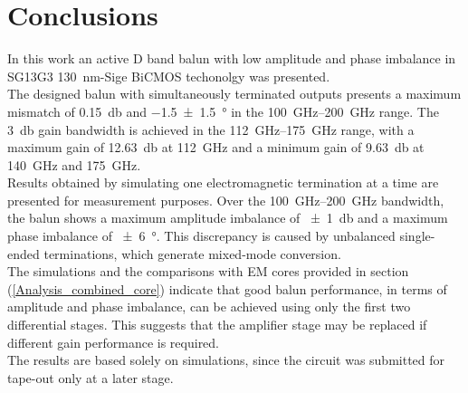 \section{Conclusions}
\label{sec:Conclusion}
In this work an active D band balun with low amplitude and phase imbalance in SG13G3 \SI{130}{\nano\meter}-Sige BiCMOS techonolgy was presented.\\
  
The designed balun with simultaneously terminated outputs presents a maximum mismatch of \SI{0.15}{\decibel} and \SI[separate-uncertainty=true]{-1.5 \pm 1.5}{\degree} in the \SIrange{100}{200}{\giga\hertz} range.
The \SI{3}{\decibel} gain bandwidth is achieved in the \SIrange{112}{175}{\giga\hertz} range, with a maximum gain of \SI{12.63}{\decibel} at \SI{112}{\giga\hertz} and a minimum gain of \SI{9.63}{\decibel} at \SI{140}{\giga\hertz} and \SI{175}{\giga\hertz}.\\

Results obtained by simulating one electromagnetic termination at a time are presented for measurement purposes. Over the \SIrange{100}{200}{\giga\hertz} bandwidth, the balun shows a maximum amplitude imbalance of \SI[separate-uncertainty=true]{\pm 1}{\decibel} and a maximum phase imbalance of \SI[separate-uncertainty=true]{\pm 6}{\degree}. This discrepancy is caused by unbalanced single-ended terminations, which generate mixed-mode conversion.\\

The simulations and the comparisons with EM cores provided in section (\ref{Analysis_combined_core}) indicate that good balun performance, in terms of amplitude and phase imbalance, can be achieved using only the first two differential stages. This suggests that the amplifier stage may be replaced if different gain performance is required.\\

The results are based solely on simulations, since the circuit was submitted for tape-out only at a later stage.

